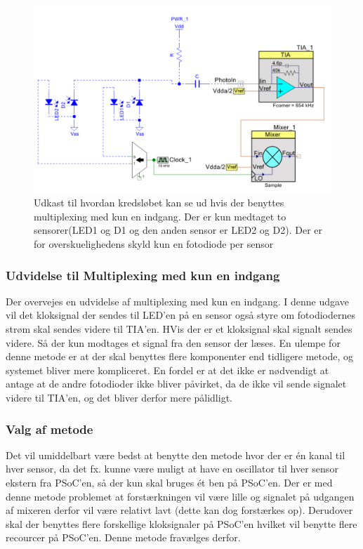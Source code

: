 \documentclass[HardwareDesign/HardwareDesign_main.tex]{subfiles}
\begin{document}
\begin{figure}[H]
    \centering
    \includegraphics[width=1\textwidth]{HardwareDesign/CupSensor/graphics/Multiplexing_en_indgang.PNG}
    \caption{Udkast til hvordan kredsløbet kan se ud hvis der benyttes multiplexing med kun en indgang. Der er kun medtaget to sensorer(LED1 og D1 og den anden sensor er LED2 og D2). Der er for overskuelighedens skyld kun en fotodiode per sensor}
    \label{fig:multiplexing_en_indgang}
\end{figure}


\subsubsection{Udvidelse til Multiplexing med kun en indgang}
Der overvejes en udvidelse af multiplexing med kun en indgang. I denne udgave vil det kloksignal der sendes til LED'en på en sensor også styre om fotodiodernes strøm skal sendes videre til TIA'en. HVis der er et kloksignal skal signalt sendes videre. Så der kun modtages et signal fra den sensor der læses. En ulempe for denne metode er at der skal benyttes flere komponenter end tidligere metode, og systemet bliver mere kompliceret. En fordel er at det ikke er nødvendigt at antage at de andre fotodioder ikke bliver påvirket, da de ikke vil sende signalet videre til TIA'en, og det bliver derfor mere pålidligt.

\subsubsection{Valg af metode}
Det vil umiddelbart være bedst at benytte den metode hvor der er én kanal til hver sensor, da det fx. kunne være muligt at have en oscillator til hver sensor ekstern fra PSoC'en, så der kun skal bruges ét ben på PSoC'en. Der er med denne metode problemet at forstærkningen vil være lille og signalet på udgangen af mixeren derfor vil være relativt lavt (dette kan dog forstærkes op). Derudover skal der benyttes flere forskellige kloksignaler på PSoC'en hvilket vil benytte flere recourcer på PSoC'en. Denne metode fravælges derfor. 
\end{document}
